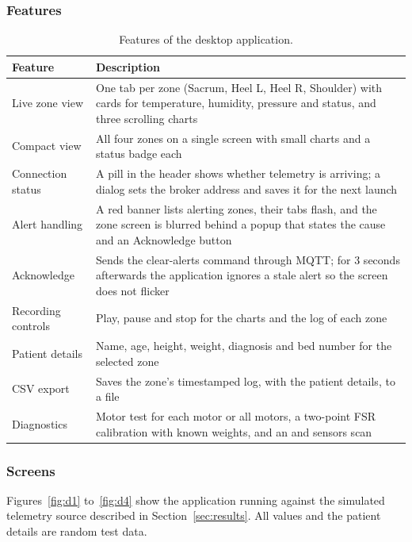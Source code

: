 \subsubsection{Features}
{\small{}
\begin{table}[H]
\centering
\begin{tabularx}{\textwidth}{@{}>{\raggedright\arraybackslash}p{3.4cm}X@{}}
\toprule
\textbf{Feature} & \textbf{Description}\\
\midrule
Live zone view & One tab per zone (Sacrum, Heel L, Heel R, Shoulder) with cards for temperature, humidity, pressure and status, and three scrolling charts\\
Compact view & All four zones on a single screen with small charts and a status badge each\\
Connection status & A pill in the header shows whether telemetry is arriving; a dialog sets the broker address and saves it for the next launch\\
Alert handling & A red banner lists alerting zones, their tabs flash, and the zone screen is blurred behind a popup that states the cause and an Acknowledge button\\
Acknowledge & Sends the clear-alerts command through MQTT; for 3 seconds afterwards the application ignores a stale alert so the screen does not flicker\\
Recording controls & Play, pause and stop for the charts and the log of each zone\\
Patient details & Name, age, height, weight, diagnosis and bed number for the selected zone\\
CSV export & Saves the zone's timestamped log, with the patient details, to a file\\
Diagnostics & Motor test for each motor or all motors, a two-point FSR calibration with known weights, and an \itwoc{} and sensors scan\\
\bottomrule
\end{tabularx}
\caption{Features of the desktop application.}
\end{table}}

\subsubsection{Screens}
Figures~\ref{fig:d1} to~\ref{fig:d4} show the application running against the simulated telemetry source described in Section~\ref{sec:results}. All values and the patient details are random test data.

